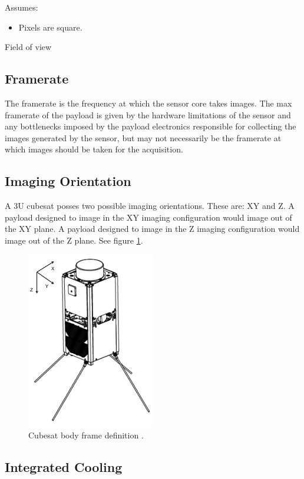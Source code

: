 \documentclass{article}
\begin{document}
Assumes:
\begin{itemize}
    \item Pixels are square. 
\end{itemize}

Field of view

\subsection{Framerate}
The framerate is the frequency at which the sensor core takes images. The max framerate of the payload is given by the hardware limitations of the sensor and any bottlenecks imposed by the payload electronics responsible for collecting the images generated by the sensor, but may not necessarily be the framerate at which images should be taken for the acquisition. 

\subsection{Imaging Orientation}
A 3U cubesat posses two possible imaging orientations. These are: XY and Z. A payload designed to image in the XY imaging configuration would image out of the XY plane. A payload designed to image in the Z imaging configuration would image out of the Z plane. See figure \ref{fig:body-frame}.

\begin{figure}[H]
\centering
\includegraphics[width=0.5\textwidth]{figures/cubesat-body-frame.png}
\caption{Cubesat body frame definition \cite{CheongEC0}.}
\label{fig:body-frame}
\end{figure}

\subsection{Integrated Cooling}
\end{document}
